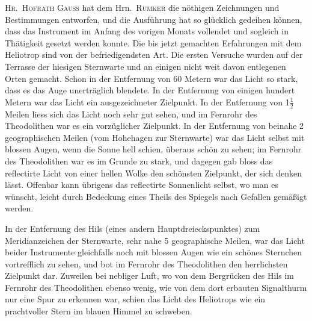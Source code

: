 \documentclass[12pt,a4paper]{article}
\theoremstyle{plain}
\theoremstyle{definition}
\theoremstyle{remark}
\begin{document}
\textsc{Hr.\ Hofrath Gau\ss{}} hat dem Hrn.\ \textsc{Rumker} die n\"othigen Zeichnungen und Bestimmungen entworfen, und die Ausf\"uhrung hat so gl\"ucklich gedeihen k\"onnen, dass das Instrument im Anfang des vorigen Monats vollendet und sogleich in Th\"atigkeit gesetzt werden konnte. Die bis jetzt gemachten Erfahrungen mit dem Heliotrop sind von der befriedigendsten Art. Die ersten Versuche wurden auf der Terrasse der hiesigen Sternwarte und an einigen nicht weit davon entlegenen Orten gemacht. Schon in der Entfernung von 60 Metern war das Licht so stark, dass es das Auge unertr\"aglich blendete. In der Entfernung von einigen hundert Metern war das Licht ein ausgezeichneter Zielpunkt. In der Entfernung von 1$\tfrac12$ Meilen liess sich das Licht noch sehr gut sehen, und im Fernrohr des Theodolithen war es ein vorz\"uglicher Zielpunkt. In der Entfernung von beinahe 2 geographischen Meilen (vom Hohehagen zur Sternwarte) war das Licht selbst mit blossen Augen, wenn die Sonne hell schien, \"uberaus sch\"on zu sehen; im Fernrohr des Theodolithen war es im Grunde zu stark, und dagegen gab bloss das reflectirte Licht von einer hellen Wolke den sch\"onsten Zielpunkt, der sich denken l\"asst. Offenbar kann \"ubrigens das reflectirte Sonnenlicht selbst, wo man es w\"unscht, leicht durch Bedeckung eines Theils des Spiegels nach Gefallen gem\"a\ss igt werden.

In der Entfernung des Hils (eines andern Hauptdreieckspunktes) zum Meridianzeichen der Sternwarte, sehr nahe 5 geographische Meilen, war das Licht beider Instrumente gleichfalls noch mit blossen Augen wie ein sch\"ones Sternchen vortrefflich zu sehen, und bot im Fernrohr des Theodolithen den herrlichsten Zielpunkt dar. Zuweilen bei nebliger Luft, wo von dem Bergr\"ucken des Hils im Fernrohr des Theodolithen ebenso wenig, wie von dem dort erbauten Signalthurm nur eine Spur zu erkennen war, schien das Licht des Heliotrops wie ein prachtvoller Stern im blauen Himmel zu schweben.
\end{document}
